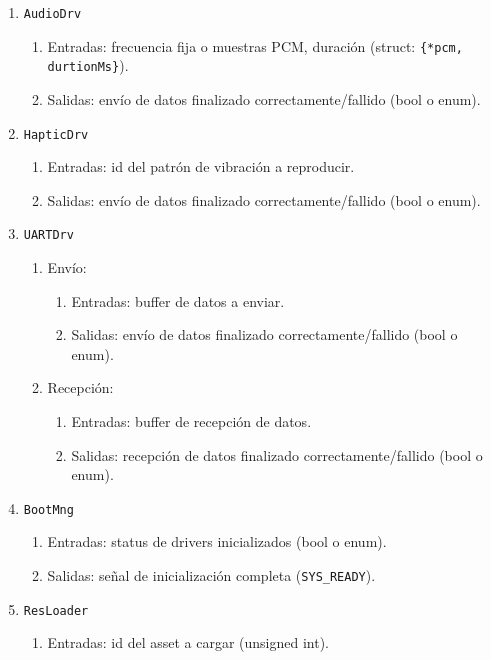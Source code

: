 \documentclass[11pt,a4paper]{article}
\begin{document}
\begin{enumerate}
  \item \texttt{AudioDrv}
    \begin{enumerate}
      \item Entradas: frecuencia fija o muestras PCM, duración (struct: \texttt{\{*pcm, durtionMs\}}).
      \item Salidas: envío de datos finalizado correctamente/fallido (bool o enum).
    \end{enumerate}
  \item \texttt{HapticDrv}
    \begin{enumerate}
      \item Entradas: id del patrón de vibración a reproducir.
      \item Salidas: envío de datos finalizado correctamente/fallido (bool o enum).
    \end{enumerate}
  \item \texttt{UARTDrv}
    \begin{enumerate}
      \item Envío:
      \begin{enumerate}
        \item Entradas: buffer de datos a enviar.
        \item Salidas: envío de datos finalizado correctamente/fallido (bool o enum).
      \end{enumerate}
      \item Recepción:
      \begin{enumerate}
        \item Entradas: buffer de recepción de datos.
        \item Salidas: recepción de datos finalizado correctamente/fallido (bool o enum).
      \end{enumerate}
    \end{enumerate}
  \item \texttt{BootMng}
    \begin{enumerate}
      \item Entradas: status de drivers inicializados (bool o enum).
      \item Salidas: señal de inicialización completa (\texttt{SYS\_READY}).
    \end{enumerate}
  \item \texttt{ResLoader}
    \begin{enumerate}
      \item Entradas: id del asset a cargar (unsigned int).

\end{enumerate}
\end{enumerate}
\end{document}
